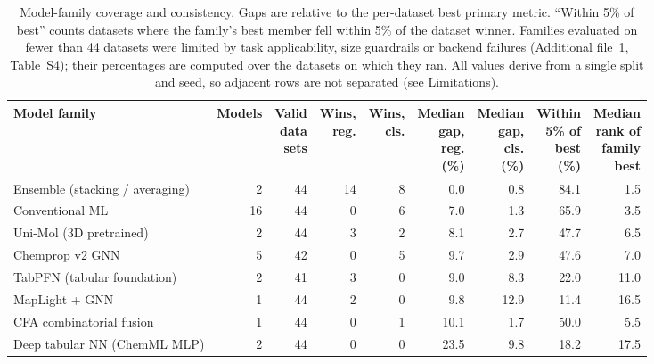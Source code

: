 \begin{table}[htbp]
\centering
\scriptsize
\setlength{\tabcolsep}{3pt}
\caption{Model-family coverage and consistency. Gaps are relative to the per-dataset best primary metric. ``Within 5\% of best'' counts datasets where the family's best member fell within 5\% of the dataset winner. Families evaluated on fewer than 44 datasets were limited by task applicability, size guardrails or backend failures (Additional file~1, Table~S4); their percentages are computed over the datasets on which they ran. All values derive from a single split and seed, so adjacent rows are not separated (see Limitations).}
\label{tab:families}
\begin{tabularx}{\textwidth}{@{}>{\raggedright\arraybackslash}Xrrrrrrrr@{}}
\toprule
\textbf{Model family} & \textbf{Models} & \makecell[r]{\textbf{Valid}\\\textbf{data}\\\textbf{sets}} & \makecell[r]{\textbf{Wins,}\\\textbf{reg.}} & \makecell[r]{\textbf{Wins,}\\\textbf{cls.}} & \makecell[r]{\textbf{Median}\\\textbf{gap,}\\\textbf{reg.}\\\textbf{(\%)}} & \makecell[r]{\textbf{Median}\\\textbf{gap,}\\\textbf{cls.}\\\textbf{(\%)}} & \makecell[r]{\textbf{Within}\\\textbf{5\% of}\\\textbf{best}\\\textbf{(\%)}} & \makecell[r]{\textbf{Median}\\\textbf{rank of}\\\textbf{family}\\\textbf{best}} \\
\midrule
Ensemble (stacking /\allowbreak{} averaging) & 2 & 44 & 14 & 8 & 0.0 & 0.8 & 84.1 & 1.5 \\
Conventional ML & 16 & 44 & 0 & 6 & 7.0 & 1.3 & 65.9 & 3.5 \\
Uni-\allowbreak{}Mol (3D pretrained) & 2 & 44 & 3 & 2 & 8.1 & 2.7 & 47.7 & 6.5 \\
Chemprop v2 GNN & 5 & 42 & 0 & 5 & 9.7 & 2.9 & 47.6 & 7.0 \\
TabPFN (tabular foundation) & 2 & 41 & 3 & 0 & 9.0 & 8.3 & 22.0 & 11.0 \\
Map\allowbreak{}Light + GNN & 1 & 44 & 2 & 0 & 9.8 & 12.9 & 11.4 & 16.5 \\
CFA combinatorial fusion & 1 & 44 & 0 & 1 & 10.1 & 1.7 & 50.0 & 5.5 \\
Deep tabular NN (ChemML MLP) & 2 & 44 & 0 & 0 & 23.5 & 9.8 & 18.2 & 17.5 \\
\bottomrule
\end{tabularx}
\end{table}
